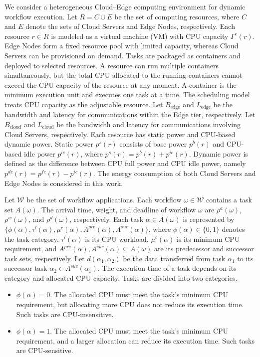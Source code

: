 \documentclass[10pt,journal]{IEEEtran}
\begin{document}
We consider a heterogeneous Cloud--Edge computing environment for dynamic workflow execution. Let $R=C\cup E$ be the set of computing resources, where $C$ and $E$ denote the sets of Cloud Servers and Edge Nodes, respectively. Each resource $r\in R$ is modeled as a virtual machine (VM) with CPU capacity $\Gamma^c(r)$. Edge Nodes form a fixed resource pool with limited capacity, whereas Cloud Servers can be provisioned on demand. Tasks are packaged as containers and deployed to selected resources. A resource can run multiple containers simultaneously, but the total CPU allocated to the running containers cannot exceed the CPU capacity of the resource at any moment. A container is the minimum execution unit and executes one task at a time. The scheduling model treats CPU capacity as the adjustable resource.
Let $B_{\mathrm{edge}}$ and $L_{\mathrm{edge}}$ be the bandwidth and latency for communications within the Edge tier, respectively. Let $B_{\mathrm{cloud}}$ and $L_{\mathrm{cloud}}$ be the bandwidth and latency for communications involving Cloud Servers, respectively. Each resource has static power and CPU-based dynamic power. Static power $p^s(r)$ consists of base power $p^b(r)$ and CPU-based idle power $p^{ic}(r)$, where $p^s(r)=p^b(r)+p^{ic}(r)$. Dynamic power is defined as the difference between CPU full power and CPU idle power, namely $p^{dc}(r)=p^{fc}(r)-p^{ic}(r)$. The energy consumption of both Cloud Servers and Edge Nodes is considered in this work.

Let $\mathcal{W}$ be the set of workflow applications. Each workflow $\omega\in\mathcal{W}$ contains a task set $A(\omega)$. The arrival time, weight, and deadline of workflow $\omega$ are $\rho^a(\omega)$, $\rho^w(\omega)$, and $\rho^d(\omega)$, respectively. Each task $\alpha\in A(\omega)$ is represented by $\{\phi(\alpha),\tau^l(\alpha),\mu^c(\alpha),A^{pre}(\alpha),A^{suc}(\alpha)\}$, where $\phi(\alpha)\in\{0,1\}$ denotes the task category, $\tau^l(\alpha)$ is its CPU workload, $\mu^c(\alpha)$ is its minimum CPU requirement, and $A^{pre}(\alpha),A^{suc}(\alpha)\subseteq A(\omega)$ are its predecessor and successor task sets, respectively. Let $d(\alpha_1,\alpha_2)$ be the data transferred from task $\alpha_1$ to its successor task $\alpha_2\in A^{suc}(\alpha_1)$. The execution time of a task depends on its category and allocated CPU capacity. Tasks are divided into two categories.
\begin{itemize}
    \item $\phi(\alpha)=0$.
    The allocated CPU must meet the task's minimum CPU requirement, but allocating more CPU does not reduce its execution time. Such tasks are CPU-insensitive.
    \item $\phi(\alpha)=1$.
    The allocated CPU must meet the task's minimum CPU requirement, and a larger allocation can reduce its execution time. Such tasks are CPU-sensitive.
\end{itemize}
\end{document}
